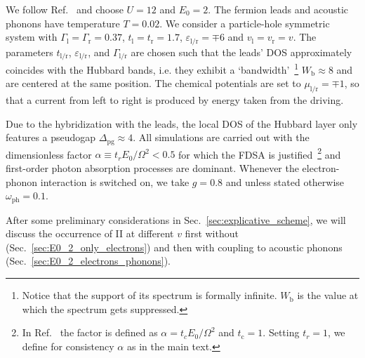 \documentclass[aps,prb,groupedaddress,showpacs,twocolumn,superscriptaddress,10pt]{revtex4-2}
\begin{document}
 We follow Ref.~\cite{so.do.18} and choose $U=12$ and $E_0=2$. The fermion leads and acoustic phonons have temperature $T=0.02$. We consider a particle-hole symmetric system with $\Gamma_{\text{l}}=\Gamma_{\text{r}}=0.37$, $t_{\text{l}}=t_{\text{r}}=1.7$, $\varepsilon_{\text{l}/\text{r}}=\mp 6$ and $v_{\text{l}}=v_{\text{r}}=v$. The parameters $t_{\text{l/r}}$, $\varepsilon_{\text{l/r}}$, and  $\Gamma_{\text{l/r}}$ are chosen such that the leads' DOS approximately coincides with the Hubbard bands, i.e. they exhibit a \textquoteleft bandwidth\textquoteright~\footnote{Notice that the support of its spectrum is formally infinite. $W_{\text{b}}$ is the value at which the spectrum gets  suppressed.} $W_{\text{b}}\approx 8$ and are centered at the same position. The chemical potentials are set to $\mu_{\text{l}/\text{r}} =\mp 1$, so that a current from left to right is produced by energy taken from the driving.
  
Due to the hybridization with the leads, the local DOS of the Hubbard layer only features a pseudogap
 $\Delta_{\text{pg}} \approx 4$.
All simulations are carried out with the dimensionless factor $\alpha\equiv t_{r}E_0/\Omega^{2}<0.5$ for which the FDSA is justified~\cite{so.do.18}\footnote{In Ref.~\cite{so.do.18} the factor is defined as $\alpha=t_{c}E_0/\Omega^{2}$ and $t_{\text{c}}=1$. Setting $t_{r}=1$, we define for consistency $\alpha$ as in the main text.} and first-order photon absorption processes are dominant. Whenever the electron-phonon interaction is switched on, we take $g=0.8$ and unless stated otherwise $\omega_{\text{ph}}=0.1$.

After some preliminary considerations in Sec.~\ref{sec:explicative_scheme}, we will discuss the occurrence of II at different $v$ first without (Sec.~\ref{sec:E0_2_only_electrons}) and then with coupling to acoustic phonons (Sec.~\ref{sec:E0_2_electrons_phonons}). 
 
\end{document}
